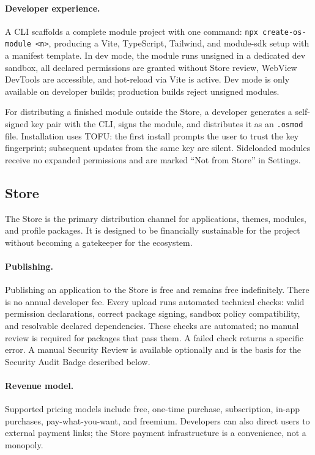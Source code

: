 \paragraph{Developer experience.}
A CLI scaffolds a complete module project with one command:
\texttt{npx create-os-module <n>}, producing a Vite, TypeScript, Tailwind,
and module-sdk setup with a manifest template. In dev mode, the module runs
unsigned in a dedicated dev sandbox, all declared permissions are granted
without Store review, WebView DevTools are accessible, and hot-reload via Vite
is active. Dev mode is only available on developer builds; production builds
reject unsigned modules.

For distributing a finished module outside the Store, a developer generates a
self-signed key pair with the CLI, signs the module, and distributes it as an
\texttt{.osmod} file. Installation uses TOFU: the first install prompts the
user to trust the key fingerprint; subsequent updates from the same key are
silent. Sideloaded modules receive no expanded permissions and are marked
``Not from Store'' in Settings.

\subsection{Store}
\label{sec:store}

The Store is the primary distribution channel for applications, themes,
modules, and profile packages. It is designed to be financially sustainable for
the project without becoming a gatekeeper for the ecosystem.

\paragraph{Publishing.}
Publishing an application to the Store is free and remains free indefinitely.
There is no annual developer fee. Every upload runs automated technical checks:
valid permission declarations, correct package signing, sandbox policy
compatibility, and resolvable declared dependencies. These checks are
automated; no manual review is required for packages that pass them. A failed
check returns a specific error. A manual Security Review is available
optionally and is the basis for the Security Audit Badge described below.

\paragraph{Revenue model.}
Supported pricing models include free, one-time purchase, subscription,
in-app purchases, pay-what-you-want, and freemium. Developers can also direct
users to external payment links; the Store payment infrastructure is a
convenience, not a monopoly.


